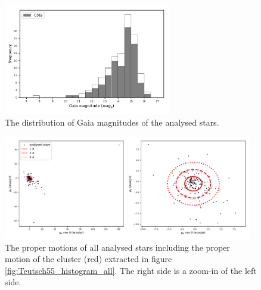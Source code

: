 \documentclass{article}
\begin{document}
\begin{figure}[H]
  \centering
    \includegraphics[trim={0 0.4cm 0 0.2cm},clip,width=0.65\textwidth]{Teutsch55_histogram_mags.pdf}
  \caption{The distribution of Gaia magnitudes of the analysed stars.}
  \label{fig:Teutsch55_histogram_mags}
\end{figure}

\begin{figure}[H]
  \centering
    \includegraphics[trim={0 0.5cm 0 0.5cm},clip,width=0.97\textwidth]{Teutsch55_pm_scatter_sigma.pdf}
  \caption{The proper motions of all analysed stars including the proper motion of the cluster (red) extracted in figure \ref{fig:Teutsch55_histogram_all}. The right side is a zoom-in of the left side.}
  \label{fig:Teutsch55_pm_scatter_sigma}
\end{figure}
\end{document}
